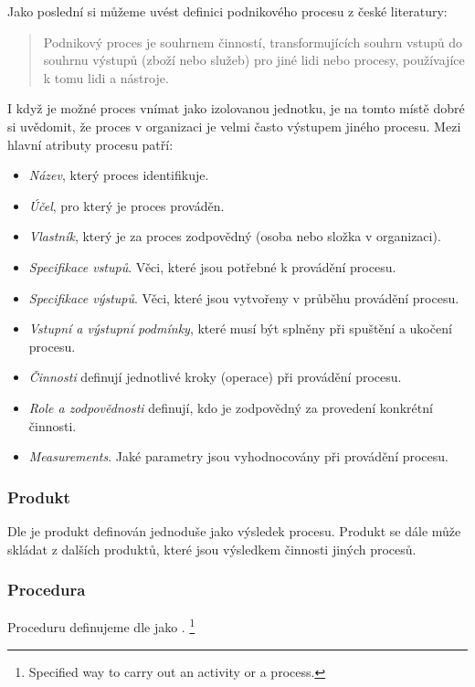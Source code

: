 \documentclass[]{article}
\begin{document}
Jako poslední si můžeme uvést definici podnikového procesu z české literatury: \cite{Repa2007}
\begin{quote}
Podnikový proces je souhrnem činností, transformujících souhrn vstupů do souhrnu výstupů (zboží nebo služeb) pro jiné lidi nebo procesy, používajíce k tomu lidi a nástroje.
\end{quote}

I když je možné proces vnímat jako izolovanou jednotku, je na tomto místě dobré si uvědomit, že proces v organizaci je velmi často výstupem jiného procesu. Mezi hlavní atributy procesu patří: \cite{Bandor2007}

\begin{itemize}
\item \textit{Název}, který proces identifikuje.
\item \textit{Účel}, pro který je proces prováděn.
\item \textit{Vlastník}, který je za proces zodpovědný (osoba nebo složka v organizaci).
\item \textit{Specifikace vstupů}. Věci, které jsou potřebné k provádění procesu.
\item \textit{Specifikace výstupů}. Věci, které jsou vytvořeny v průběhu provádění procesu.
\item \textit{Vstupní a výstupní podmínky}, které musí být splněny při spuštění a ukočení procesu.
\item \textit{Činnosti} definují jednotlivé kroky (operace) při provádění procesu.
\item \textit{Role a zodpovědnosti} definují, kdo je zodpovědný za provedení konkrétní činnosti.
\item \textit{Measurements}. Jaké parametry jsou vyhodnocovány při provádění procesu.
\end{itemize}

\subsubsection{Produkt}
Dle \cite{iso_9000} je produkt definován jednoduše jako výsledek procesu. Produkt se dále může skládat z dalších produktů, které jsou výsledkem činnosti jiných procesů.

\subsubsection{Procedura}
Proceduru definujeme dle \cite{iso_9000} jako \textit{}.
\footnote{Specified way to carry out an activity or a process.\cite{iso_9000}}
\end{document}
